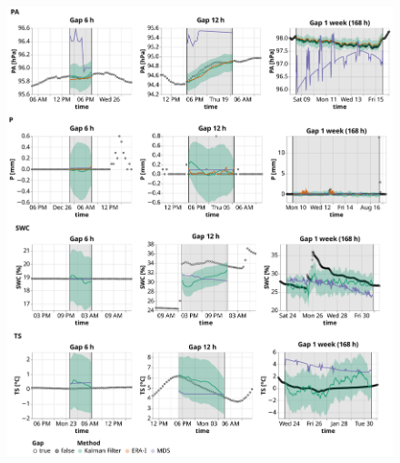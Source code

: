 \documentclass{article}
\newcommand{\imgwidth}{6in}
\let\Oldsubsection\subsection
\renewcommand{\subsection}{\FloatBarrier\Oldsubsection}
\begin{document}
\begin{figure}
\centerline{\includegraphics[width=\imgwidth]{timeseries_2_2}}
\caption{}
\label{fig:ts_3-2}
\end{figure}
\restoregeometry


\newcommand{\CapGapLen}{Imputation performance of the Kalman filter in comparison to the state-of-the-art
methods: ERA-Interim (ERA-I) and Marginal Distribution Sampling (MDS), using mean and standard deviation of the \textit{Root Mean Square Error} (RMSE). The best method for each gap length is highlighted in bold. For each combination of gap length and variable, 500 artificial gaps were created.}


\newcommand{\CapControl}{Comparison of the KF performance between a model that uses control variables (\textit{KF-Gen-Sin-6\_336}) and models that do not use control variables (\textit{KF-Gen-Sin-6\_336-No\_Contr}). The table displays the mean, the standard deviation (std) and the standard error (se) of the \textit{Root Mean Square Error} (RMSE). In addition the difference (diff.) between the mean of two models is shown. The best method for each gap length is highlighted in bold. For each combination of gap length and variable, 500 artificial gaps were created.}

\end{document}
